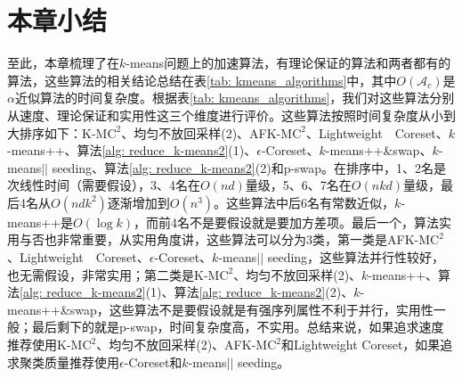 \section{本章小结}
至此，本章梳理了在$k$-means问题上的加速算法，有理论保证的算法和两者都有的算法，这些算法的相关结论总结在表\ref{tab: kmeans_algorithms}中，其中$O(\mathcal{A}_c)$是$\alpha$近似算法的时间复杂度。根据表\ref{tab: kmeans_algorithms}，我们对这些算法分别从速度、理论保证和实用性这三个维度进行评价。这些算法按照时间复杂度从小到大排序如下：K-M$\text{C}^2$、均匀不放回采样(2)、AFK-M$\text{C}^2$、Lightweight　Coreset、$k$-means++、算法\ref{alg: reduce_k-means2}(1)、$\epsilon$-Coreset、$k$-means++\&swap、$k$-means\(\vert \vert\) seeding、算法\ref{alg: reduce_k-means2}(2)和p-swap。在排序中，1、2名是次线性时间（需要假设），3、4名在$O(nd)$量级，5、6、7名在$O(nkd)$量级，最后4名从$O(ndk^2)$逐渐增加到$O(n^3)$。这些算法中后6名有常数近似，$k$-means++是$O(\log k)$，而前4名不是要假设就是要加方差项。最后一个，算法实用与否也非常重要，从实用角度讲，这些算法可以分为3类，第一类是AFK-M$\text{C}^2$、Lightweight　Coreset、$\epsilon$-Coreset、$k$-means\(\vert \vert\) seeding，这些算法并行性较好，也无需假设，非常实用；第二类是K-M$\text{C}^2$、均匀不放回采样(2)、$k$-means++、算法\ref{alg: reduce_k-means2}(1)、算法\ref{alg: reduce_k-means2}(2)、$k$-means++\&swap，这些算法不是要假设就是有强序列属性不利于并行，实用性一般；最后剩下的就是p-swap，时间复杂度高，不实用。总结来说，如果追求速度推荐使用K-M$\text{C}^2$、均匀不放回采样(2)、AFK-M$\text{C}^2$和Lightweight Coreset，如果追求聚类质量推荐使用$\epsilon$-Coreset和$k$-means\(\vert \vert\) seeding。%

